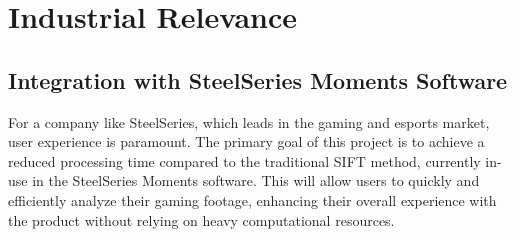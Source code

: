 \section{Industrial Relevance}
\subsection{Integration with SteelSeries Moments Software}
For a company like SteelSeries, which leads in the gaming and esports market, user experience is paramount. The primary goal of this project is to achieve a reduced processing time compared to the traditional SIFT method, currently in-use in the SteelSeries Moments software. This will allow users to quickly and efficiently analyze their gaming footage, enhancing their overall experience with the product without relying on heavy computational resources.
